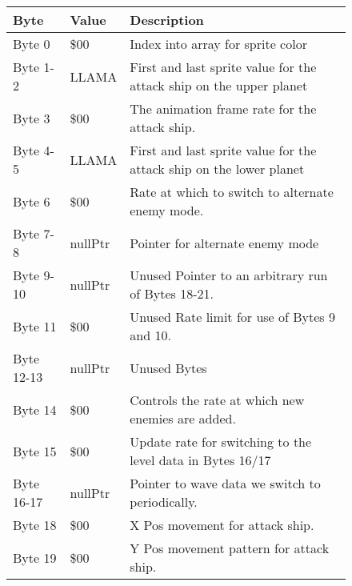 \begin{figure}[H]
  {
  \setlength{\tabcolsep}{3.0pt}
  \setlength\cmidrulewidth{\heavyrulewidth} %
  \begin{adjustbox}{width=12cm}

\begin{tabular}{lll}
\toprule
 Byte       & Value                     & Description                                                         \\
\midrule
 Byte 0     & \$00                       & Index into array for sprite color                                   \\
 Byte 1-2   & LLAMA                     & First and last sprite value for the attack ship on the upper planet \\
 Byte 3     & \$00                       & The animation frame rate for the attack ship.                       \\
 Byte 4-5   & LLAMA                     & First and last sprite value for the attack ship on the lower planet \\
 Byte 6     & \$00                       & Rate at which to switch to alternate enemy mode.                    \\
 Byte 7-8   & nullPtr                   & Pointer for alternate enemy mode                                    \\
 Byte 9-10  & nullPtr                   & Unused Pointer to an arbitrary run of Bytes 18-21.                  \\
 Byte 11    & \$00                       & Unused Rate limit for use of Bytes 9 and 10.                        \\
 Byte 12-13 & nullPtr                   & Unused Bytes                                                        \\
 Byte 14    & \$00                       & Controls the rate at which new enemies are added.                   \\
 Byte 15    & \$00                       & Update rate for switching to the level data in Bytes 16/17          \\
 Byte 16-17 & nullPtr                   & Pointer to wave data we switch to periodically.                     \\
 Byte 18    & \$00                       & X Pos movement for attack ship.                                     \\
 Byte 19    & \$00                       & Y Pos movement pattern for attack ship.                             \\

\end{tabular}
\end{adjustbox}}
\end{figure}
